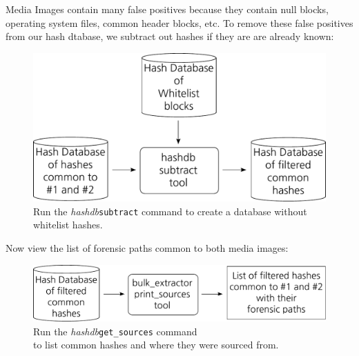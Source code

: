 \documentclass[12pt,twoside]{article}
\newcommand{\hdb}{\emph{hashdb}\xspace}
\begin{document}
Media Images contain many false positives because they contain
null blocks, operating system files, common header blocks, etc.
To remove these false positives from our hash dtabase,
we subtract out hashes if they are are already known:

\begin{figure}[H]
  \center
  \includegraphics[scale=0.6]{drawings/subtract_whitelist}
  \caption*{Run the \hdb \texttt{subtract} command to create a database without whitelist hashes.}
\end{figure}

Now view the list of forensic paths common to both media images:

\begin{figure}[H]
  \center
  \includegraphics[scale=0.6]{drawings/print_sources}
  \caption*{Run the \hdb \texttt{get\_sources} command \\
            to list common hashes and where they were sourced from.}
\end{figure}

\end{document}
